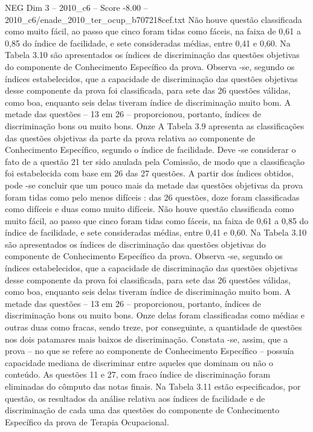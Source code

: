 \begin{textsample}{NEG Dim 3 – 2010\_c6 – Score -8.00 – 2010\_c6/enade\_2010\_ter\_ocup\_b707218cef.txt}
Não houve questão classificada como muito fácil, ao passo que cinco foram tidas como fáceis, na faixa de 0,61 a 0,85 do índice de facilidade, e sete consideradas médias, entre 0,41 e 0,60.
Na Tabela 3.10 são apresentados os índices de discriminação das questões objetivas do componente de Conhecimento Específico da prova.
Observa -se, segundo os índices estabelecidos, que a capacidade de discriminação das questões objetivas desse componente da prova foi classificada, para sete das 26 questões válidas, como boa, enquanto seis delas tiveram índice de discriminação muito bom.
A metade das questões – 13 em 26 – proporcionou, portanto, índices de discriminação bons ou muito bons.
Onze A Tabela 3.9 apresenta as classificações das questões objetivas da parte da prova relativa ao componente de Conhecimento Específico, segundo o índice de facilidade.
Deve -se considerar o fato de a questão 21 ter sido anulada pela Comissão, de modo que a classificação foi estabelecida com base em 26 das 27 questões.
A partir dos índices obtidos, pode -se concluir que um pouco mais da metade das questões objetivas da prova foram tidas como pelo menos difíceis : das 26 questões, doze foram classificadas como difíceis e duas como muito difíceis.
Não houve questão classificada como muito fácil, ao passo que cinco foram tidas como fáceis, na faixa de 0,61 a 0,85 do índice de facilidade, e sete consideradas médias, entre 0,41 e 0,60.
Na Tabela 3.10 são apresentados os índices de discriminação das questões objetivas do componente de Conhecimento Específico da prova.
Observa -se, segundo os índices estabelecidos, que a capacidade de discriminação das questões objetivas desse componente da prova foi classificada, para sete das 26 questões válidas, como boa, enquanto seis delas tiveram índice de discriminação muito bom.
A metade das questões – 13 em 26 – proporcionou, portanto, índices de discriminação bons ou muito bons.
Onze delas foram classificadas como médias e outras duas como fracas, sendo treze, por conseguinte, a quantidade de questões nos dois patamares mais baixos de discriminação.
Constata -se, assim, que a prova – no que se refere ao componente de Conhecimento Específico – possuía capacidade mediana de discriminar entre aqueles que dominam ou não o conteúdo.
As questões 11 e 27, com fraco índice de discriminação foram eliminadas do cômputo das notas finais.
Na Tabela 3.11 estão especificados, por questão, os resultados da análise relativa aos índices de facilidade e de discriminação de cada uma das questões do componente de Conhecimento Específico da prova de Terapia Ocupacional.

\end{textsample}
